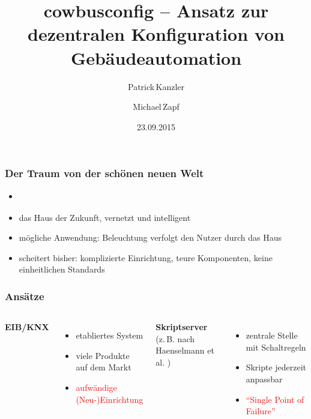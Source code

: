 \documentclass{beamer}
\title{cowbusconfig – Ansatz zur dezentralen Konfiguration von Gebäudeautomation}
\author[P. Kanzler, M. Zapf]{Patrick\,Kanzler \and Michael\,Zapf}
\date{23.09.2015}
\newcommand{\todo}[1]{\textbf{\color{red}{TODO: #1}}}
\newcommand{\customitemsep}{7pt}
\begin{document}
\frame{\titlepage}

\begin{frame}
	\frametitle{Der Traum von der schönen neuen Welt}

	\begin{itemize} \setlength{\itemsep}{\customitemsep}
		\item \todo{schön darstellen, vielleicht mit Bildern, momentan nur Stichpunkte}
		\item das Haus der Zukunft, vernetzt und intelligent
		\item mögliche Anwendung: Beleuchtung verfolgt den Nutzer durch das Haus
        \item scheitert bisher: komplizierte Einrichtung, teure Komponenten, keine einheitlichen Standards
	\end{itemize}
\end{frame}

\begin{frame}
	\frametitle{Ansätze}
    \begin{columns}[c]
        \column[c]{10cm}
            \textbf{EIB/KNX} \cite{knx-prod}
            \begin{itemize} \setlength{\itemsep}{\customitemsep}
                \item etabliertes System
                \item viele Produkte auf dem Markt
                    \vspace*{0.5cm}
                \item \textcolor{red}{aufwändige (Neu-)Einrichtung}
            \end{itemize}
            \pause
        \column{10cm}
            \textbf{Skriptserver} \\
            {\fontsize{15pt}{18pt} \selectfont (z.\,B. nach Haenselmann et al. \cite{haenselmann2007skriptbasierte})}
            \begin{itemize} \setlength{\itemsep}{\customitemsep}
                \item zentrale Stelle mit Schaltregeln
                \item Skripte jederzeit anpassbar
                    \vspace*{0.5cm}
                \item \textcolor{red}{\enquote{Single Point of Failure}}
            \end{itemize}
    \end{columns}
\end{frame}
\end{document}
